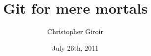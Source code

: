 \documentclass[aspectratio=169]{beamer}
\title{Git for mere mortals}
\author{Christopher Giroir}
\date{July 26th, 2011}
\begin{document}
\titlepage
\end{document}
